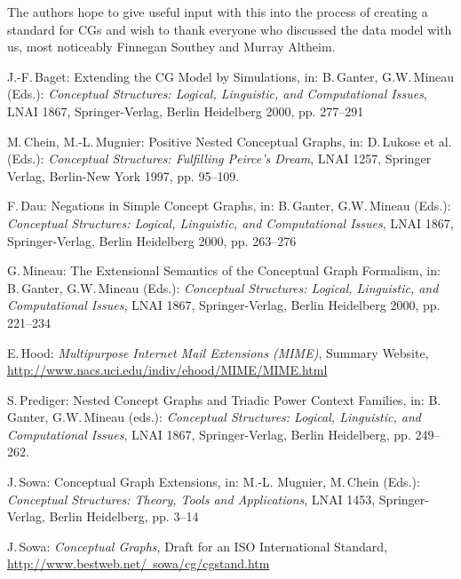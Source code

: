 \documentclass{article}
\begin{document}
The authors hope to give useful input with this into the process of
creating a standard for CGs and wish to thank everyone who discussed
the data model with us, most noticeably Finnegan Southey and Murray
Altheim.

\begin{thebibliography}{ABCDE99}

 J.-F.\,Baget: Extending the CG Model by
  Simulations, in: B.\,Ganter, G.W.\,Mineau (Eds.):
  \textit{Conceptual Structures: Logical, Linguistic, and Computational
  Issues}, LNAI 1867, Springer-Verlag, Berlin Heidelberg 2000,
  pp. 277--291

 M.\,Chein, M.-L.\,Mugnier: Positive Nested
  Conceptual Graphs, in: D.\,Lukose et al. (Eds.): \textit{Conceptual
  Structures: Fulfilling Peirce's Dream}, LNAI 1257, Springer Verlag,
  Berlin-New York 1997, pp. 95--109.

 F.\,Dau: Negations in Simple Concept Graphs, in:
  B.\,Ganter, G.W.\,Mineau (Eds.):
  \textit{Conceptual Structures: Logical, Linguistic, and Computational
  Issues}, LNAI 1867, Springer-Verlag, Berlin Heidelberg 2000, pp. 263--276

 G.\,Mineau: The Extensional Semantics of the Conceptual
  Graph Formalism, in: B.\,Ganter, G.W.\,Mineau (Eds.):
  \textit{Conceptual Structures: Logical, Linguistic, and Computational
  Issues}, LNAI 1867, Springer-Verlag, Berlin Heidelberg 2000, pp. 221--234

 E.\,Hood: \textit{Multipurpose Internet Mail Extensions
  (MIME)}, Summary Website,\\
  \href{http://www.nacs.uci.edu/indiv/ehood/MIME/MIME.html}
       {http://www.nacs.uci.edu/indiv/ehood/MIME/MIME.html}

 S.\,Prediger: Nested Concept Graphs and Triadic
  Power Context Families, in: B.\,Ganter, G.W.\,Mineau (eds.):
  \textit{Conceptual Structures: Logical, Linguistic, and Computational
  Issues}, LNAI 1867, Springer-Verlag, Berlin Heidelberg, pp. 249--262.

 J.\,Sowa: Conceptual Graph Extensions, in: M.-L.
  Mugnier, M.\,Chein (Eds.): \textit{Conceptual Structures: Theory,
  Tools and Applications}, LNAI 1453, Springer-Verlag, Berlin Heidelberg,
  pp. 3--14

 J.\,Sowa: \textit{Conceptual Graphs}, Draft for
  an ISO International Standard,
  \href{http://www.bestweb.net/~sowa/cg/cgstand.htm}
       {http://www.bestweb.net/~sowa/cg/cgstand.htm}


\end{thebibliography}
\end{document}
